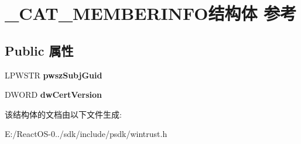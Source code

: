 \hypertarget{struct___c_a_t___m_e_m_b_e_r_i_n_f_o}{}\section{\+\_\+\+C\+A\+T\+\_\+\+M\+E\+M\+B\+E\+R\+I\+N\+F\+O结构体 参考}
\label{struct___c_a_t___m_e_m_b_e_r_i_n_f_o}
\subsection*{Public 属性}
\begin{DoxyCompactItemize}
\item 
\mbox{\label{struct___c_a_t___m_e_m_b_e_r_i_n_f_o_a5b0e8ccc050a5d2a66563d64577d5397}} 
L\+P\+W\+S\+TR {\bfseries pwsz\+Subj\+Guid}
\item 
\mbox{\label{struct___c_a_t___m_e_m_b_e_r_i_n_f_o_a0ff39fccd90edc82b24bc8ebd5b803ad}} 
D\+W\+O\+RD {\bfseries dw\+Cert\+Version}
\end{DoxyCompactItemize}


该结构体的文档由以下文件生成\+:\begin{DoxyCompactItemize}
\item 
E\+:/\+React\+O\+S-\/0../sdk/include/psdk/wintrust.\+h\end{DoxyCompactItemize}

